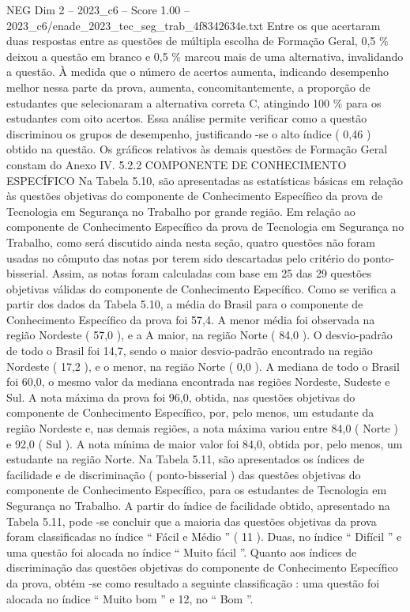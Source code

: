 \begin{textsample}{NEG Dim 2 – 2023\_c6 – Score 1.00 – 2023\_c6/enade\_2023\_tec\_seg\_trab\_4f8342634e.txt}
Entre os que acertaram duas respostas entre as questões de múltipla escolha de Formação Geral, 0,5 \% deixou a questão em branco e 0,5 \% marcou mais de uma alternativa, invalidando a questão.
À medida que o número de acertos aumenta, indicando desempenho melhor nessa parte da prova, aumenta, concomitantemente, a proporção de estudantes que selecionaram a alternativa correta C, atingindo 100 \% para os estudantes com oito acertos.
Essa análise permite verificar como a questão discriminou os grupos de desempenho, justificando -se o alto índice ( 0,46 ) obtido na questão.
Os gráficos relativos às demais questões de Formação Geral constam do Anexo IV. 5.2.2 COMPONENTE DE CONHECIMENTO ESPECÍFICO Na Tabela 5.10, são apresentadas as estatísticas básicas em relação às questões objetivas do componente de Conhecimento Específico da prova de Tecnologia em Segurança no Trabalho por grande região.
Em relação ao componente de Conhecimento Específico da prova de Tecnologia em Segurança no Trabalho, como será discutido ainda nesta seção, quatro questões não foram usadas no cômputo das notas por terem sido descartadas pelo critério do ponto-bisserial.
Assim, as notas foram calculadas com base em 25 das 29 questões objetivas válidas do componente de Conhecimento Específico.
Como se verifica a partir dos dados da Tabela 5.10, a média do Brasil para o componente de Conhecimento Específico da prova foi 57,4.
A menor média foi observada na região Nordeste ( 57,0 ), e a A maior, na região Norte ( 84,0 ).
O desvio-padrão de todo o Brasil foi 14,7, sendo o maior desvio-padrão encontrado na região Nordeste ( 17,2 ), e o menor, na região Norte ( 0,0 ).
A mediana de todo o Brasil foi 60,0, o mesmo valor da mediana encontrada nas regiões Nordeste, Sudeste e Sul.
A nota máxima da prova foi 96,0, obtida, nas questões objetivas do componente de Conhecimento Específico, por, pelo menos, um estudante da região Nordeste e, nas demais regiões, a nota máxima variou entre 84,0 ( Norte ) e 92,0 ( Sul ).
A nota mínima de maior valor foi 84,0, obtida por, pelo menos, um estudante na região Norte.
Na Tabela 5.11, são apresentados os índices de facilidade e de discriminação ( ponto-bisserial ) das questões objetivas do componente de Conhecimento Específico, para os estudantes de Tecnologia em Segurança no Trabalho.
A partir do índice de facilidade obtido, apresentado na Tabela 5.11, pode -se concluir que a maioria das questões objetivas da prova foram classificadas no índice “ Fácil e Médio ” ( 11 ).
Duas, no índice “ Difícil ” e uma questão foi alocada no índice “ Muito fácil ”.
Quanto aos índices de discriminação das questões objetivas do componente de Conhecimento Específico da prova, obtém -se como resultado a seguinte classificação : uma questão foi alocada no índice “ Muito bom ” e 12, no “ Bom ”.

\end{textsample}
